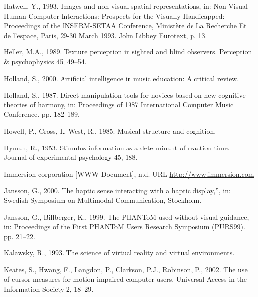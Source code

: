 \documentclass[
]{book}
\newlength{\cslhangindent}
\newlength{\cslentryspacingunit} %
\newenvironment{CSLReferences}[2] %
 {%
  \setlength{\parindent}{0pt}
  \ifodd #1
  \let\oldpar\par
  \def\par{\hangindent=\cslhangindent\oldpar}
  \fi
  \setlength{\parskip}{#2\cslentryspacingunit}
 }%
 {}
\begin{document}
\begin{CSLReferences}{1}{0}
\leavevmode{}%
Hatwell, Y., 1993. Images and non-visual spatial representations, in: Non-Visual Human-Computer Interactions: Prospects for the Visually Handicapped: Proceedings of the INSERM-SETAA Conference, Minist{è}re de La Recherche Et de l'espace, Paris, 29-30 March 1993. John Libbey Eurotext, p. 13.

\leavevmode{}%
Heller, M.A., 1989. Texture perception in sighted and blind observers. Perception \& psychophysics 45, 49--54.

\leavevmode{}%
Holland, S., 2000. Artificial intelligence in music education: A critical review.

\leavevmode{}%
Holland, S., 1987. Direct manipulation tools for novices based on new cognitive theories of harmony, in: Proceedings of 1987 International Computer Music Conference. pp. 182--189.

\leavevmode{}%
Howell, P., Cross, I., West, R., 1985. Musical structure and cognition.

\leavevmode{}%
Hyman, R., 1953. Stimulus information as a determinant of reaction time. Journal of experimental psychology 45, 188.

\leavevmode{}%
Immersion corporation {[}WWW Document{]}, n.d. URL \url{http://www.immersion.com}

\leavevmode{}%
Jansson, G., 2000. The haptic sense interacting with a haptic display,'', in: Swedish Symposium on Multimodal Communication, Stockholm.

\leavevmode{}%
Jansson, G., Billberger, K., 1999. The PHANToM used without visual guidance, in: Proceedings of the First PHANToM Users Research Symposium (PURS99). pp. 21--22.

\leavevmode{}%
Kalawsky, R., 1993. The science of virtual reality and virtual environments.

\leavevmode{}%
Keates, S., Hwang, F., Langdon, P., Clarkson, P.J., Robinson, P., 2002. The use of cursor measures for motion-impaired computer users. Universal Access in the Information Society 2, 18--29.


\end{CSLReferences}
\end{document}
